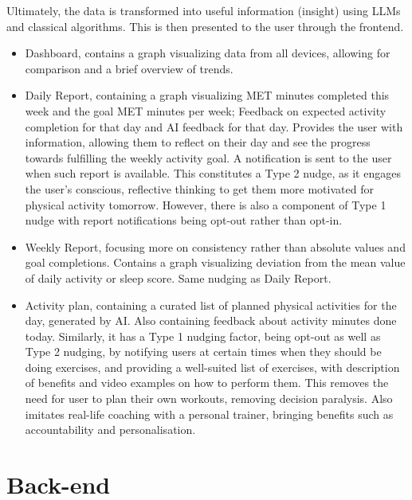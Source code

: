 Ultimately, the data is transformed into useful information (insight) using LLMs and classical algorithms. This is then presented to the user through the frontend. 
\begin{itemize}
    \item {Dashboard, contains a graph visualizing data from all devices, allowing for comparison and a brief overview of trends.}
    \item {Daily Report, containing a graph visualizing MET minutes completed this week and the goal MET minutes per week; Feedback on expected activity completion for that day and AI feedback for that day. Provides the user with information, allowing them to reflect on their day and see the progress towards fulfilling the weekly activity goal. A notification is sent to the user when such report is available. This constitutes a Type 2 nudge, as it engages the user's conscious, reflective thinking to get them more motivated for physical activity tomorrow. However, there is also a component of Type 1 nudge with report notifications being opt-out rather than opt-in.}
    \item {Weekly Report, focusing more on consistency rather than absolute values and goal completions. Contains a graph visualizing deviation from the mean value of daily activity or sleep score. Same nudging as Daily Report.}
    \item {Activity plan, containing a curated list of planned physical activities for the day, generated by AI. Also containing feedback about activity minutes done today. Similarly, it has a Type 1 nudging factor, being opt-out as well as Type 2 nudging, by notifying users at certain times when they should be doing exercises, and providing a well-suited list of exercises, with description of benefits and video examples on how to perform them. This removes the need for user to plan their own workouts, removing decision paralysis. Also imitates real-life coaching with a personal trainer, bringing benefits such as accountability and personalisation.}
\end{itemize}

\section{Back-end}


